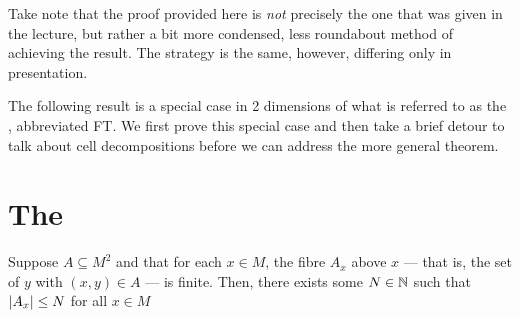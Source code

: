 \begin{svgraybox}
	Take note that the proof provided here is \emph{not} precisely the one that was given in the lecture, but rather a bit more condensed, less roundabout method of achieving the result. The strategy is the same, however, differing only in presentation.
\end{svgraybox}


The following result is a special case in 2 dimensions of what is referred to as the \emph{\Ft}, abbreviated FT. We first prove this special case and then take a brief detour to talk about cell decompositions before we can address the more general theorem.

\section{The \bPFT}

\begin{theorem}[\FT in $M^2$]
	\label{thm:2finiteness}
	Suppose $A \subseteq M^2$ and that for each $x \in M$, the fibre $A_x$ above $x$ — that is, the set of $y$ with $(x, y) \in A$ — is finite. Then, there exists some $N \in \mathbb{N}$ such that $\vert A_x\vert \leq N$ for all $x \in M$
\end{theorem}

